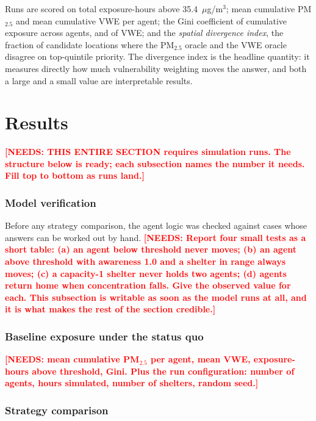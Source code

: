 \documentclass[graybox]{svmult}
\newcommand{\NEEDS}[1]{\textcolor{red}{\textbf{[NEEDS: #1]}}}
\begin{document}
Runs are scored on total exposure-hours above 35.4~$\mu$g/m$^3$; mean cumulative
PM$_{2.5}$ and mean cumulative VWE per agent; the Gini coefficient of cumulative
exposure across agents, and of VWE; and the \emph{spatial divergence index}, the
fraction of candidate locations where the PM$_{2.5}$ oracle and the VWE oracle
disagree on top-quintile priority. The divergence index is the headline quantity:
it measures directly how much vulnerability weighting moves the answer, and both
a large and a small value are interpretable results.

\section{Results}
\label{sec:4}

\NEEDS{THIS ENTIRE SECTION requires simulation runs. The structure below is
ready; each subsection names the number it needs. Fill top to bottom as runs
land.}

\subsubsection{Model verification}

Before any strategy comparison, the agent logic was checked against cases whose
answers can be worked out by hand.
\NEEDS{Report four small tests as a short table: (a) an agent below threshold
never moves; (b) an agent above threshold with awareness 1.0 and a shelter in
range always moves; (c) a capacity-1 shelter never holds two agents; (d) agents
return home when concentration falls. Give the observed value for each. This
subsection is writable as soon as the model runs at all, and it is what makes the
rest of the section credible.}

\subsubsection{Baseline exposure under the status quo}

\NEEDS{mean cumulative PM$_{2.5}$ per agent, mean VWE, exposure-hours above
threshold, Gini. Plus the run configuration: number of agents, hours simulated,
number of shelters, random seed.}

\subsubsection{Strategy comparison}
\end{document}
